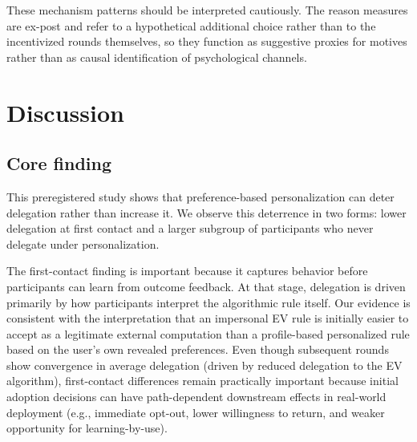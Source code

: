 \documentclass[a4paper, 12pt, fleqn]{article}
\theoremstyle{definition}
\begin{document}
These mechanism patterns should be interpreted cautiously. The reason measures are ex-post and refer to a hypothetical additional choice rather than to the incentivized rounds themselves, so they function as suggestive proxies for motives rather than as causal identification of psychological channels.







\section{Discussion}
\label{sec:discussion}

\subsection{Core finding}
This preregistered study shows that preference-based personalization can deter delegation rather than increase it. We observe this deterrence in two forms: lower delegation at first contact and a larger subgroup of participants who never delegate under personalization.

The first-contact finding is important because it captures behavior before participants can learn from outcome feedback. At that stage, delegation is driven primarily by how participants interpret the algorithmic rule itself. Our evidence is consistent with the interpretation that an impersonal EV rule is initially easier to accept as a legitimate external computation than a profile-based personalized rule based on the user's own revealed preferences. Even though subsequent rounds show convergence in average delegation (driven by reduced delegation to the EV algorithm), first-contact differences remain practically important because initial adoption decisions can have path-dependent downstream effects in real-world deployment (e.g., immediate opt-out, lower willingness to return, and weaker opportunity for learning-by-use).
\end{document}
